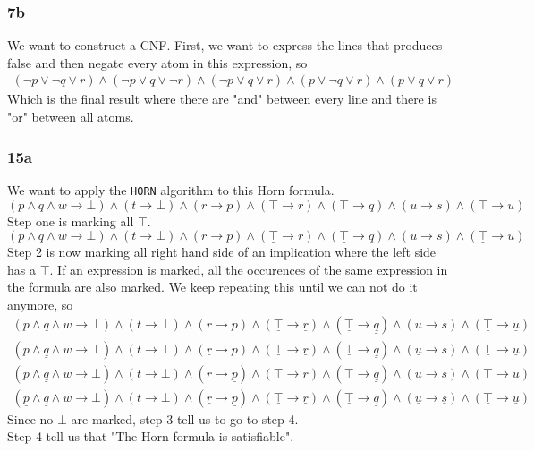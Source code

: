 \documentclass[12pt]{article}
\let\imp\to
\begin{document}
\subsubsection*{7b}
We want to construct a CNF. First, we want to express the lines that produces false and then negate every atom in this expression, so
\begin{align*}
(\neg p\lor\neg q\lor r)\land(\neg p\lor q\lor\neg r)\land(\neg p\lor q\lor r)\land(p\lor\neg q\lor r)\land(p\lor q\lor r)
\end{align*}
Which is the final result where there are "and" between every line and there is "or" between all atoms.

\subsubsection*{15a}
We want to apply the \texttt{HORN} algorithm to this Horn formula.
$$(p \land q \land w \imp \bot) \land (t \imp \bot) \land (r \imp p) \land (\top \imp r) \land (\top \imp q) \land (u \imp s) \land (\top \imp u)$$
Step one is marking all $\top$.\\
$$(p \land q \land w \imp \bot) \land (t \imp \bot) \land (r \imp p) \land (\underline{\top} \imp r) \land (\underline{\top} \imp q) \land (u \imp s) \land (\underline{\top} \imp u)$$
Step 2 is now marking all right hand side of an implication where the left side has a $\top$. If an expression is marked, all the occurences of the same expression in the formula are also marked. We keep repeating this until we can not do it anymore, so
\begin{align*}
(p \land q \land w \imp \bot) \land (t \imp \bot) \land (r \imp p) \land (\underline{\top} \imp \underline{r}) \land (\underline{\top} \imp \underline{q}) \land (u \imp s) \land (\underline{\top} \imp \underline{u}) \\
(p \land \underline{q} \land w \imp \bot) \land (t \imp \bot) \land (\underline{r} \imp p) \land (\underline{\top} \imp \underline{r}) \land (\underline{\top} \imp \underline{q}) \land (\underline{u} \imp s) \land (\underline{\top} \imp \underline{u}) \\
(p \land \underline{q} \land w \imp \bot) \land (t \imp \bot) \land (\underline{r} \imp \underline{p}) \land (\underline{\top} \imp \underline{r}) \land (\underline{\top} \imp \underline{q}) \land (\underline{u} \imp \underline{s}) \land (\underline{\top} \imp \underline{u}) \\
(\underline{p} \land \underline{q} \land w \imp \bot) \land (t \imp \bot) \land (\underline{r} \imp \underline{p}) \land (\underline{\top} \imp \underline{r}) \land (\underline{\top} \imp \underline{q}) \land (\underline{u} \imp \underline{s}) \land (\underline{\top} \imp \underline{u})
\end{align*}
Since no $\bot$ are marked, step 3 tell us to go to step 4.\\
Step 4 tell us that "The Horn formula is satisfiable".
\end{document}
